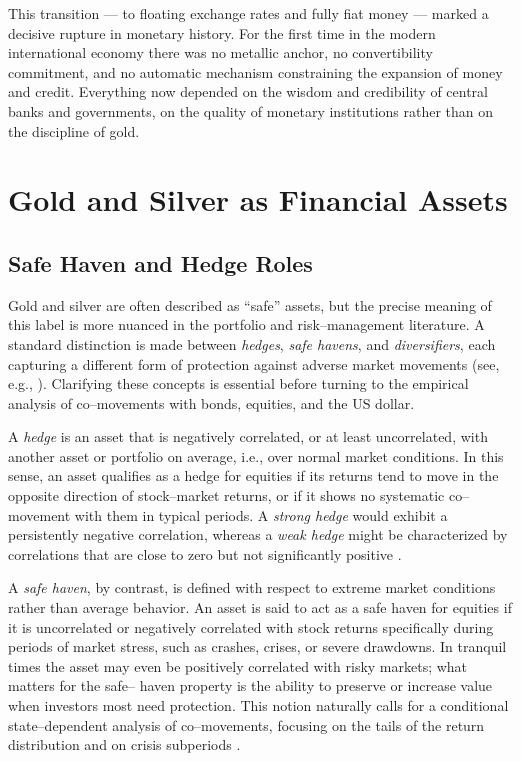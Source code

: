 This transition --- to floating exchange rates and fully fiat money --- marked a decisive rupture in monetary history. For the first time in the modern international economy there was no metallic anchor, no convertibility commitment, and no automatic mechanism constraining the expansion of money and credit. Everything now depended on the wisdom and credibility of central banks and governments, on the quality of monetary institutions rather than on the discipline of gold.
\section{Gold and Silver as Financial Assets}
\subsection{Safe Haven and Hedge Roles}

Gold and silver are often described as ``safe'' assets, but the precise meaning of this
label is more nuanced in the portfolio and risk–management literature. A standard
distinction is made between \emph{hedges}, \emph{safe havens}, and \emph{diversifiers},
each capturing a different form of protection against adverse market movements (see, e.g.,
). Clarifying these concepts is essential before
turning to the empirical analysis of co–movements with bonds, equities, and the US dollar.

A \emph{hedge} is an asset that is negatively correlated, or at least uncorrelated, with
another asset or portfolio on average, i.e., over normal market conditions. In this sense,
an asset qualifies as a hedge for equities if its returns tend to move in the opposite
direction of stock–market returns, or if it shows no systematic co–movement with them in
typical periods. A \emph{strong hedge} would exhibit a persistently negative correlation,
whereas a \emph{weak hedge} might be characterized by correlations that are close to zero
but not significantly positive .

A \emph{safe haven}, by contrast, is defined with respect to extreme market conditions
rather than average behavior. An asset is said to act as a safe haven for equities if it
is uncorrelated or negatively correlated with stock returns specifically during periods of
market stress, such as crashes, crises, or severe drawdowns. In tranquil times the
asset may even be positively correlated with risky markets; what matters for the safe–
haven property is the ability to preserve or increase value when investors most need
protection. This notion naturally calls for a conditional state–dependent analysis of
co–movements, focusing on the tails of the return distribution and on crisis subperiods
.

